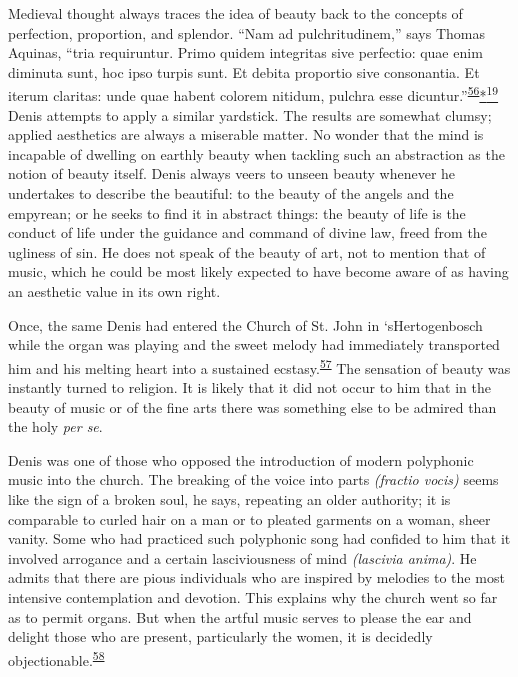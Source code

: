 Medieval thought always traces the idea of beauty back to the concepts
of perfection, proportion, and splendor. ``Nam ad pulchritudinem,'' says
Thomas Aquinas, ``tria requiruntur. Primo quidem integritas sive
perfectio: quae enim diminuta sunt, hoc ipso turpis sunt. Et debita
proportio sive consonantia. Et iterum claritas: unde quae habent colorem
nitidum, pulchra esse
dicuntur.''\textsuperscript{\protect\hypertarget{20_ILLUSTRATIONS_FOLLOW_PAGE.xhtmlux5cux23id_361}{\protect\hyperlink{23_NOTES.xhtmlux5cux23id_362}{56}}}\protect\hypertarget{20_ILLUSTRATIONS_FOLLOW_PAGE.xhtmlux5cux23id_2351}{\protect\hyperlink{23_NOTES.xhtmlux5cux23id_2352}{*\textsuperscript{19}}}
Denis attempts to apply a similar yardstick. The results are somewhat
clumsy; applied aesthetics are always a miserable matter. No wonder that
the mind is incapable of dwelling on earthly beauty when tackling such
an abstraction as the notion of beauty itself. Denis always veers to
unseen beauty whenever he undertakes to describe the beautiful: to the
beauty of the angels and the empyrean; or he seeks to find it in
abstract things: the beauty of life is the conduct of life under the
guidance and command of divine law, freed from the ugliness of sin. He
does not speak of the beauty of art, not to mention that of music, which
he could be most likely expected to have become aware of as having an
aesthetic value in its own right.

Once, the same Denis had entered the Church of St. John in
`sHertogenbosch while the organ was playing and the sweet melody had
immediately transported him and his melting heart into a sustained
ecstasy.\textsuperscript{\protect\hypertarget{20_ILLUSTRATIONS_FOLLOW_PAGE.xhtmlux5cux23id_359}{\protect\hyperlink{23_NOTES.xhtmlux5cux23id_360}{57}}}
The sensation of beauty was instantly turned to religion. It is likely
that it did not occur to him that in the beauty of music or of the fine
arts there was something else to be admired than the holy \emph{per se}.

Denis was one of those who opposed the introduction of modern polyphonic
music into the church. The breaking of the voice into parts
\emph{(fractio vocis)} seems like the sign of a broken soul, he says,
repeating an older authority; it is comparable to curled hair on a man
or to pleated garments on a woman, sheer vanity. Some who had practiced
such polyphonic song had confided to him that it involved arrogance and
a certain lasciviousness of mind \emph{(lascivia anima)}. He admits that
there are pious individuals who are inspired
\protect\hypertarget{20_ILLUSTRATIONS_FOLLOW_PAGE.xhtmlux5cux23page_323}{}{}by
melodies to the most intensive contemplation and devotion. This explains
why the church went so far as to permit organs. But when the artful
music serves to please the ear and delight those who are present,
particularly the women, it is decidedly
objectionable.\textsuperscript{\protect\hypertarget{20_ILLUSTRATIONS_FOLLOW_PAGE.xhtmlux5cux23id_357}{\protect\hyperlink{23_NOTES.xhtmlux5cux23id_358}{58}}}

